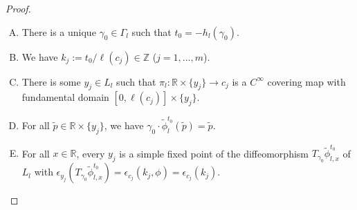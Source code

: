 \documentclass{memo-l}
\theoremstyle{plain}
\theoremstyle{definition}
\theoremstyle{remark}
\newcommand{\R}{\mathbb{R}}
\newcommand{\Z}{\mathbb{Z}}
\numberwithin{section}{chapter}
\numberwithin{equation}{section}%
\begin{document}
\begin{proof}
\begin{enumerate}[(A)]
\item\label{i-(A): t_0 = h_l(gamma_0)} There is a unique $\gamma_0\in\Gamma_l$ such that $t_0=-h_l(\gamma_0)$. 

\item\label{i-(A): k_j = t_0/ell(c_j) in Z} We have $k_j:=t_0/\ell(c_j)\in\Z$ ($j=1,\dots,m$).

\item\label{i-(A): pi_l: R times y_j to c_j} There is some $y_j\in L_l$ such that $\pi_l:\R\times\{y_j\}\to c_j$ is a $C^\infty$ covering map with fundamental domain $[0,\ell(c_j)]\times\{y_j\}$.

\item\label{i-(A): gamma_0 cdot tilde phi_l^t_0(tilde p) = tilde p} For all $\tilde p\in\R\times\{y_j\}$, we have $\gamma_0\cdot\tilde\phi_l^{t_0}(\tilde p)=\tilde p$.

\item\label{i-(A): epsilon_{y_j}(T_gamma_0 tilde phi_l x^t_0) = epsilon_c_j(k_j)} For all $x\in\R$, every $y_j$ is a simple fixed point of the diffeomorphism $T_{\gamma_0}\tilde\phi_{l,x}^{t_0}$ of $L_l$ with $\epsilon_{y_j}(T_{\gamma_0}\tilde\phi_{l,x}^{t_0})=\epsilon_{c_j}(k_j,\phi)=\epsilon_{c_j}(k_j)$.


\end{enumerate}
\end{proof}
\end{document}
